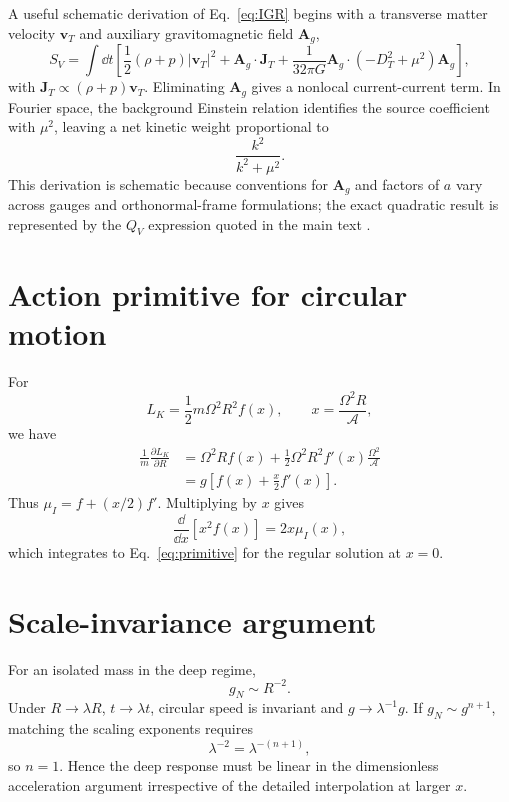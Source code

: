 \documentclass[11pt]{article}
\newcommand{\vT}{\bm{v}_{T}}
\begin{document}
A useful schematic derivation of Eq.~\eqref{eq:IGR} begins with a transverse matter velocity $\vT$ and auxiliary gravitomagnetic field $\bm A_g$,
\begin{equation}
    S_V=\int\dd t\left[
    \frac12(\rho+p)|\vT|^2
    +\bm A_g\cdot\bm J_T
    +\frac{1}{32\pi G}\bm A_g\cdot(-D_T^2+\mu^2)\bm A_g
    \right],
\end{equation}
with $\bm J_T\propto(\rho+p)\vT$. Eliminating $\bm A_g$ gives a nonlocal current-current term. In Fourier space, the background Einstein relation identifies the source coefficient with $\mu^2$, leaving a net kinetic weight proportional to
\begin{equation}
    \frac{k^2}{k^2+\mu^2}.
\end{equation}
This derivation is schematic because conventions for $\bm A_g$ and factors of $a$ vary across gauges and orthonormal-frame formulations; the exact quadratic result is represented by the $Q_V$ expression quoted in the main text \cite{DeFeliceProc}.

\section{Action primitive for circular motion}

For
\begin{equation}
    L_K=\frac12m\Omega^2R^2f(x),
    \qquad
    x=\frac{\Omega^2R}{\mathcal A},
\end{equation}
we have
\begin{align}
    \frac{1}{m}\frac{\partial L_K}{\partial R}
    &=\Omega^2R f(x)
    +\frac12\Omega^2R^2 f'(x)\frac{\Omega^2}{\mathcal A}\\
    &=g\left[f(x)+\frac{x}{2}f'(x)\right].
\end{align}
Thus $\mu_I=f+(x/2)f'$. Multiplying by $x$ gives
\begin{equation}
    \frac{\dd}{\dd x}\left[x^2 f(x)\right]
    =2x\mu_I(x),
\end{equation}
which integrates to Eq.~\eqref{eq:primitive} for the regular solution at $x=0$.

\section{Scale-invariance argument}

For an isolated mass in the deep regime,
\begin{equation}
    g_N\sim R^{-2}.
\end{equation}
Under $R\to\lambda R$, $t\to\lambda t$, circular speed is invariant and $g\to\lambda^{-1}g$. If $g_N\sim g^{n+1}$, matching the scaling exponents requires
\begin{equation}
    \lambda^{-2}=\lambda^{-(n+1)},
\end{equation}
so $n=1$. Hence the deep response must be linear in the dimensionless acceleration argument irrespective of the detailed interpolation at larger $x$.
\end{document}
